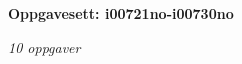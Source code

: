 \centerline{\bf Oppgavesett: i00721no-i00730no}
\vskip 10pt
\centerline{\it 10 oppgaver}\vskip 10pt
\vskip 10pt
